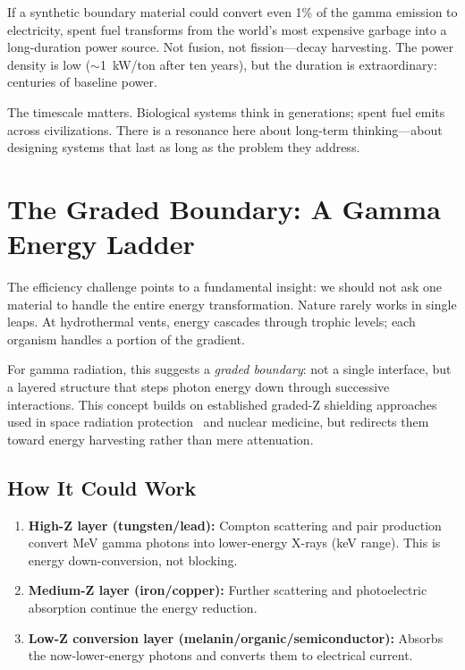 \documentclass[12pt]{article}
\begin{document}
If a synthetic boundary material could convert even 1\% of the gamma emission to
electricity, spent fuel transforms from the world's most expensive garbage into a
long-duration power source. Not fusion, not fission---decay harvesting. The power density
is low ($\sim$1~kW/ton after ten years), but the duration is extraordinary: centuries of
baseline power.

The timescale matters. Biological systems think in generations; spent fuel emits across
civilizations. There is a resonance here about long-term thinking---about designing
systems that last as long as the problem they address.

\section{The Graded Boundary: A Gamma Energy Ladder}
\label{sec:graded}

The efficiency challenge points to a fundamental insight: we should not ask one material
to handle the entire energy transformation. Nature rarely works in single leaps. At
hydrothermal vents, energy cascades through trophic levels; each organism handles a
portion of the gradient.

For gamma radiation, this suggests a \emph{graded boundary}: not a single interface, but
a layered structure that steps photon energy down through successive interactions. This
concept builds on established graded-Z shielding approaches used in space radiation
protection~\cite{atwell2013} and nuclear medicine, but redirects them toward energy
harvesting rather than mere attenuation.

\subsection*{How It Could Work}

\begin{enumerate}
    \item \textbf{High-Z layer (tungsten/lead):} Compton scattering and pair production
    convert MeV gamma photons into lower-energy X-rays (keV range). This is energy
    down-conversion, not blocking.

    \item \textbf{Medium-Z layer (iron/copper):} Further scattering and photoelectric
    absorption continue the energy reduction.

    \item \textbf{Low-Z conversion layer (melanin/organic/semiconductor):} Absorbs the
    now-lower-energy photons and converts them to electrical current.
\end{enumerate}
\end{document}
